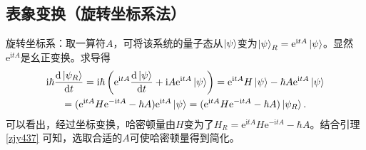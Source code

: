 \documentclass[
fontsetup = font-setup-open.tex,
titlesetup = titles-setup.tex
]{AJbook}
\numberwithin{equation}{section}
\begin{document}
\subsection{表象变换（旋转坐标系法）}
旋转坐标系：取一算符$ A $，可将该系统的量子态从$ \ket{\psi} $变为$ \ket{\psi}_R=\mathrm{e}^{\mathrm{i}tA}\ket{\psi} $。显然$ \mathrm{e}^{\mathrm{i}tA} $是幺正变换。求导得
\begin{equation}\label{key}
\begin{gathered}
\mathrm{i}\hbar\frac{\mathrm{d}\ket{\psi_R}}{\mathrm{d}t}
=\mathrm{i}\hbar\left(\mathrm{e}^{\mathrm{i}tA}\frac{\mathrm{d}\ket{\psi}}{\mathrm{d}t}+\mathrm{i}A\mathrm{e}^{\mathrm{i}tA}\ket{\psi}\right)
=\mathrm{e}^{\mathrm{i}tA}H\ket{\psi}-\hbar A\mathrm{e}^{\mathrm{i}tA}\ket{\psi}\\
=(\mathrm{e}^{\mathrm{i}tA}H\mathrm{e}^{-\mathrm{i}tA}-\hbar A)\mathrm{e}^{\mathrm{i}tA}\ket{\psi}
=(\mathrm{e}^{\mathrm{i}tA}H\mathrm{e}^{-\mathrm{i}tA}-\hbar A)\ket{\psi_R}.
\end{gathered}
\end{equation}
可以看出，经过坐标变换，哈密顿量由$ H $变为了$ H_R=\mathrm{e}^{\mathrm{i}tA}H\mathrm{e}^{-\mathrm{i}tA}-\hbar A $。结合引理 \ref{zjy437} 可知，选取合适的$ A $可使哈密顿量得到简化。
\end{document}
